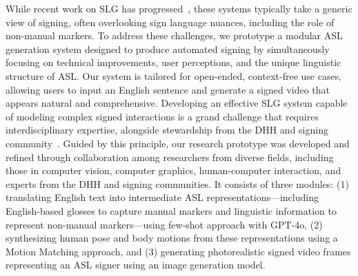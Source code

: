 While recent work on SLG has progressed~\cite{fang2024signllm, hohenberger2002modality, saunders_progressive_2020, moryossef2023open, stoll2018sign, huenerfauth2008generating}, these systems typically take a generic view of signing, often overlooking sign language nuances, including the role of non-manual markers. 
To address these challenges, we prototype a modular ASL generation system designed to produce automated signing by simultaneously focusing on technical improvements, user perceptions, and the unique linguistic structure of ASL. Our system is tailored for open-ended, context-free use cases, allowing users to input an English sentence and generate a signed video that appears natural and comprehensive. Developing an effective SLG system capable of modeling complex signed interactions is a grand challenge that requires interdisciplinary expertise, alongside stewardship from the DHH and signing community~\cite{bragg_sign_2019}. Guided by this principle, our research prototype was developed and refined through collaboration among researchers from diverse fields, including those in computer vision, computer graphics, human-computer interaction, and experts from the DHH and signing communities. It consists of three modules: (1) translating English text into intermediate ASL representations---including English-based glosses to capture manual markers and linguistic information to represent non-manual markers---using few-shot approach with GPT-4o, (2) synthesizing human pose and body motions from these representations using a Motion Matching approach, and (3) generating photorealistic signed video frames representing an ASL signer using an image generation model. 

